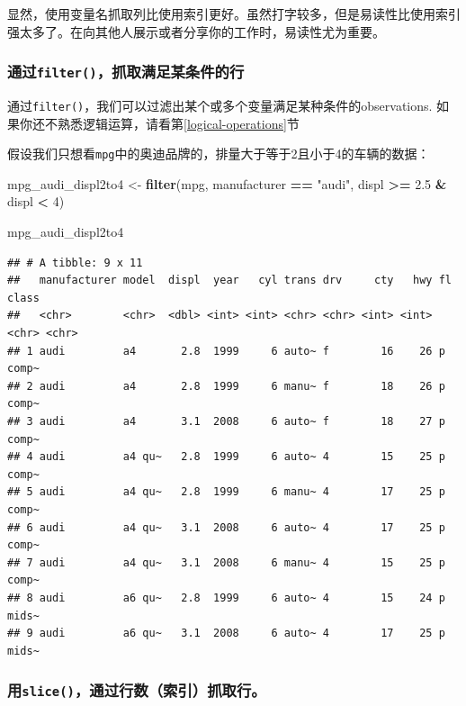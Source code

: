 \documentclass[]{book}
\newenvironment{Shaded}{\begin{snugshade}}{\end{snugshade}}
\newcommand{\DecValTok}[1]{\textcolor[rgb]{0.00,0.00,0.81}{#1}}
\newcommand{\FloatTok}[1]{\textcolor[rgb]{0.00,0.00,0.81}{#1}}
\newcommand{\KeywordTok}[1]{\textcolor[rgb]{0.13,0.29,0.53}{\textbf{#1}}}
\newcommand{\NormalTok}[1]{#1}
\newcommand{\OperatorTok}[1]{\textcolor[rgb]{0.81,0.36,0.00}{\textbf{#1}}}
\newcommand{\StringTok}[1]{\textcolor[rgb]{0.31,0.60,0.02}{#1}}
\begin{document}
显然，使用变量名抓取列比使用索引更好。虽然打字较多，但是易读性比使用索引强太多了。在向其他人展示或者分享你的工作时，易读性尤为重要。

\hypertarget{filter}{%
\subsubsection{\texorpdfstring{通过\texttt{filter()}，抓取满足某条件的行}{通过filter()，抓取满足某条件的行}}\label{filter}}

通过\texttt{filter()}，我们可以过滤出某个或多个变量满足某种条件的observations. 如果你还不熟悉逻辑运算，请看第\ref{logical-operations}节

假设我们只想看\texttt{mpg}中的奥迪品牌的，排量大于等于2且小于4的车辆的数据：

\begin{Shaded}
\begin{Highlighting}[]
\NormalTok{mpg_audi_displ2to4 <-}\StringTok{ }\KeywordTok{filter}\NormalTok{(mpg, manufacturer }\OperatorTok{==}\StringTok{ "audi"}\NormalTok{, displ }\OperatorTok{>=}\StringTok{ }\FloatTok{2.5} \OperatorTok{&}\StringTok{ }\NormalTok{displ }\OperatorTok{<}\StringTok{ }\DecValTok{4}\NormalTok{)}

\NormalTok{mpg_audi_displ2to4}
\end{Highlighting}
\end{Shaded}

\begin{verbatim}
## # A tibble: 9 x 11
##   manufacturer model  displ  year   cyl trans drv     cty   hwy fl    class
##   <chr>        <chr>  <dbl> <int> <int> <chr> <chr> <int> <int> <chr> <chr>
## 1 audi         a4       2.8  1999     6 auto~ f        16    26 p     comp~
## 2 audi         a4       2.8  1999     6 manu~ f        18    26 p     comp~
## 3 audi         a4       3.1  2008     6 auto~ f        18    27 p     comp~
## 4 audi         a4 qu~   2.8  1999     6 auto~ 4        15    25 p     comp~
## 5 audi         a4 qu~   2.8  1999     6 manu~ 4        17    25 p     comp~
## 6 audi         a4 qu~   3.1  2008     6 auto~ 4        17    25 p     comp~
## 7 audi         a4 qu~   3.1  2008     6 manu~ 4        15    25 p     comp~
## 8 audi         a6 qu~   2.8  1999     6 auto~ 4        15    24 p     mids~
## 9 audi         a6 qu~   3.1  2008     6 auto~ 4        17    25 p     mids~
\end{verbatim}

\hypertarget{slice}{%
\subsubsection{\texorpdfstring{用\texttt{slice()}，通过行数（索引）抓取行。}{用slice()，通过行数（索引）抓取行。}}\label{slice}}
\end{document}
